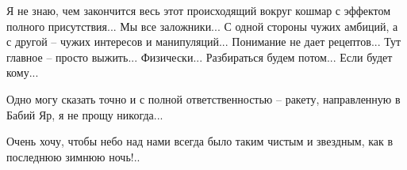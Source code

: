 Я не знаю, чем закончится весь этот происходящий вокруг кошмар с эффектом
полного присутствия... Мы все заложники... С одной стороны чужих амбиций, а с
другой – чужих интересов и манипуляций... Понимание не дает рецептов... Тут
главное – просто выжить... Физически... Разбираться будем потом... Если будет
кому... 

Одно могу сказать точно и с полной ответственностью – ракету, направленную в
Бабий Яр, я не прощу никогда... 

Очень хочу, чтобы небо над нами всегда было таким чистым и звездным, как в
последнюю зимнюю ночь!..
